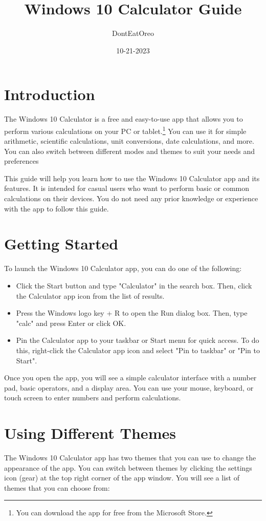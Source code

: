 \documentclass[12pt]{article}
\title{Windows 10 Calculator Guide}
\author{DontEatOreo}
\date{10-21-2023}
\begin{document}
\maketitle

\pagebreak

\tableofcontents

\pagebreak

\section{Introduction}
The Windows 10 Calculator is a free and easy-to-use app that allows you to perform various calculations on your PC or tablet.\footnote{You can download the app for free from the Microsoft Store.} You can use it for simple arithmetic, scientific calculations, unit conversions, date calculations, and more. You can also switch between different modes and themes to suit your needs and preferences

This guide will help you learn how to use the Windows 10 Calculator app and its features. It is intended for casual users who want to perform basic or common calculations on their devices. You do not need any prior knowledge or experience with the app to follow this guide.

\section{Getting Started}
To launch the Windows 10 Calculator app, you can do one of the following:
\begin{itemize}
    \item Click the Start button and type "Calculator" in the search box. Then, click the Calculator app icon from the list of results.
    \item Press the Windows logo key + R to open the Run dialog box. Then, type "calc" and press Enter or click OK.
    \item Pin the Calculator app to your taskbar or Start menu for quick access. To do this, right-click the Calculator app icon and select "Pin to taskbar" or "Pin to Start".
\end{itemize}

Once you open the app, you will see a simple calculator interface with a number pad, basic operators, and a display area. You can use your mouse, keyboard, or touch screen to enter numbers and perform calculations.

\section{Using Different Themes}
The Windows 10 Calculator app has two themes that you can use to change the appearance of the app. You can switch between themes by clicking the settings icon (gear) at the top right corner of the app window. You will see a list of themes that you can choose from:
\end{document}
